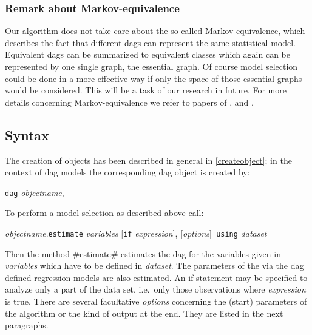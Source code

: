 \subsubsection*{Remark about Markov-equivalence}

Our algorithm does not take care about the so-called Markov
equivalence, which describes the fact that different dags can
represent the same statistical model. Equivalent dags can be
summarized to equivalent classes which again can be represented by
one single graph, the essential graph. Of course model selection
could be done in a more effective way if only the space of those
essential graphs would be considered. This will be a task of our
research in future. For more details concerning Markov-equivalence
we refer to papers of ,  and
.





\subsection{Syntax}
%
 
%
The creation of objects has been described in general in
\autoref{createobject}; in the context of dag models the
corresponding dag object is created by:

\begin{center}
{\texttt{dag} {\em objectname}},\\
\end{center}

To perform a model selection as described above call:

\begin{center}
{{\em objectname}.\texttt{estimate} {\em variables} [\texttt{if}
{\em expression}], [{\em options}]\texttt{ using} {\em dataset} }
\bigskip
\end{center}

Then the method #estimate# estimates the dag for the variables
given in {\it variables} which have to be defined in {\it
dataset}. The parameters of the via the dag defined regression
models are also estimated. An if-statement may be specified to
analyze only a part of the data set, i.e.~only those observations
where {\it expression} is true. There are several facultative {\it
options} concerning the (start) parameters of the algorithm or the
kind of output at the end. They are listed in the next paragraphs.

